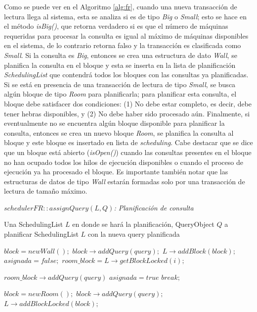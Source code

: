 Como se puede ver en el Algoritmo \ref{alg:fr}, cuando una nueva transacción de lectura llega al sistema, esta se analiza si es de tipo \textit{Big} o \textit{Small}; esto se hace en el método \textit{isBig()}, que retorna verdadero si es que el número de máquinas requeridas para procesar la consulta es igual al máximo de máquinas disponibles en el sistema, de lo contrario retorna falso y la transacción es clasificada como \textit{Small}. Si la consulta es \textit{Big}, entonces se crea una estructura de dato \textit{Wall}, se planifica la consulta en el bloque y esta se inserta en la lista de planificación \textit{SchedulingList} que contendrá todos los bloques con las consultas ya planificadas. Si se está en presencia de una transacción de lectura de tipo \textit{Small}, se busca algún bloque de tipo \textit{Room} para planificarla; para planificar esta consulta, el bloque debe satisfacer dos condiciones: (1) No debe estar completo, es decir, debe tener hebras disponibles, y (2) No debe haber sido procesado aún. Finalmente, si eventualmente no se encuentra algún bloque disponible para planificar la consulta, entonces se crea un nuevo bloque \textit{Room}, se planifica la consulta al bloque y este bloque es insertado en lista de \textit{scheduling}. Cabe destacar que se dice que un bloque está abierto (\textit{isOpen()}) cuando las consultas presentes en el bloque no han ocupado todos los hilos de ejecución disponibles o cuando el proceso de ejecución ya ha procesado el bloque. Es importante también notar que las estructuras de datos de tipo \textit{Wall} estarán formadas solo por una transacción de lectura de tamaño máximo.

\begin{algorithm}[!th]
\caption{\em $schedulerFR::assignQuery(L, Q)$: Planificación de consulta}
\label{alg:fr}
\begin{algorithmic}[1]
\REQUIRE Una SchedulingList $L$ en donde se hará la planificación, QueryObject $Q$ a planificar
\ENSURE SchedulingList $L$ con la nueva query planificada

	\STATE $block = new Wall();$
	\STATE $block \rightarrow addQuery(query);$
	\STATE $L \rightarrow addBlock(block);$
\ELSE
	\STATE $asignada = false;$
		\STATE $room\_block = L \rightarrow getBlockLocked(i);$
		
			\STATE $room\_block \rightarrow addQuery(query)$
			\STATE $asignada = true$
			\STATE $break;$
		\ENDIF
	\ENDFOR
	
		\STATE $block = new Room();$
		\STATE $block \rightarrow addQuery(query);$
		\STATE $L \rightarrow addBlockLocked(block);$		
	\ENDIF
\ENDIF

\end{algorithmic}
\end{algorithm}

